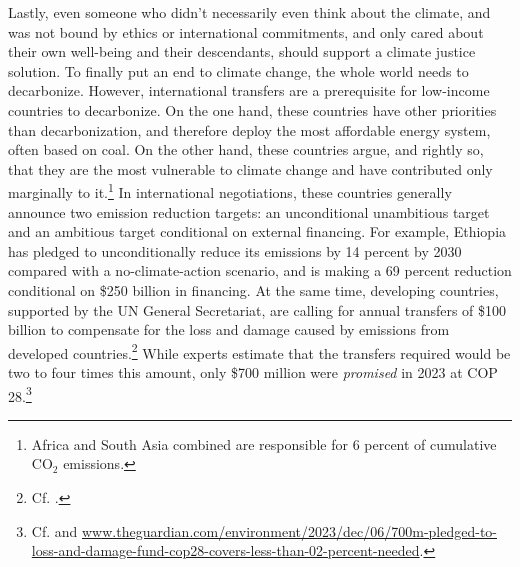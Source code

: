 \documentclass[a5paper,english,openany]{memoir}
\begin{document}
Lastly, even someone who didn't necessarily even think about the climate, and was not bound by ethics or international commitments, and only cared about their own well-being and their descendants, should support a climate justice solution. %
To finally %
put an end to climate change, %
the whole world needs to decarbonize. %
However, international transfers are a prerequisite for low-income countries to decarbonize. %
On the one hand, these countries have other priorities than decarbonization, %
and therefore deploy the most affordable energy system, %
often based on coal. On the other hand, these countries argue, %
and rightly so, %
that they are the most vulnerable to climate change and have contributed only marginally to it.\footnote{Africa and South Asia combined are responsible for 6 percent of cumulative CO$_\text{2}$ emissions.} %
In international negotiations, these countries generally announce two emission reduction targets: an unconditional unambitious target and an ambitious target conditional on external financing. For example, Ethiopia has pledged to unconditionally reduce its emissions by 14 percent by 2030 compared with a no-climate-action scenario,
and is making a 69 percent reduction conditional on \$250 billion in financing. %
At the same time, developing countries, supported by the UN General Secretariat,  %
are calling for annual transfers of \$100 billion to compensate for the loss and damage caused by emissions from developed countries.\footnote{Cf. \cite{tc_proposal_2023,sgnu_bridgetown_2023}.} While experts estimate that the transfers required would be two to four times this amount, only \$700 million were \textit{promised} in 2023 at COP 28.\footnote{Cf. \cite{songwe_climate_2023,markandya_integrated_2019,robinson_valuing_2021} and \href{https://www.theguardian.com/environment/2023/dec/06/700m-pledged-to-loss-and-damage-fund-cop28-covers-less-than-02-percent-needed}{www.theguardian.com/environment/2023/dec/06/700m-pledged-to-loss-and-damage-fund-cop28-covers-less-than-02-percent-needed}.}
\end{document}
